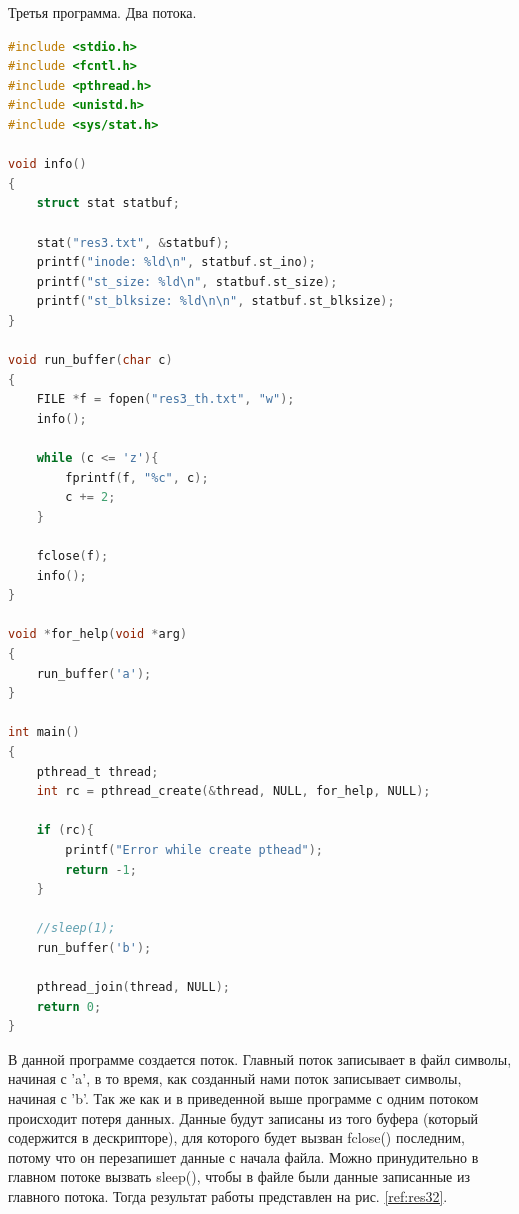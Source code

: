 \documentclass[a4paper,oneside,12pt]{extreport}
\begin{document}
\begin{task}
    \newpage

    Третья программа. Два потока.
    \begin{lstlisting}[language=C]
#include <stdio.h>
#include <fcntl.h>
#include <pthread.h>
#include <unistd.h>
#include <sys/stat.h>

void info()
{
	struct stat statbuf;
	
	stat("res3.txt", &statbuf);
	printf("inode: %ld\n", statbuf.st_ino);
	printf("st_size: %ld\n", statbuf.st_size);
	printf("st_blksize: %ld\n\n", statbuf.st_blksize);
}

void run_buffer(char c)
{
	FILE *f = fopen("res3_th.txt", "w");
	info();
	
	while (c <= 'z'){
		fprintf(f, "%c", c);
		c += 2;
	}
	
	fclose(f);
	info();
}

void *for_help(void *arg)
{
	run_buffer('a');
}

int main()
{
	pthread_t thread;
	int rc = pthread_create(&thread, NULL, for_help, NULL);
	
	if (rc){
		printf("Error while create pthead");
		return -1;
	}
	
	//sleep(1);
	run_buffer('b');
	
	pthread_join(thread, NULL);
	return 0;
}
    \end{lstlisting}

    В данной программе создается поток.
    Главный поток записывает в файл символы, начиная с 'a', в то время, как созданный
    нами поток записывает символы, начиная с 'b'. 
    Так же как и в приведенной выше программе с одним потоком происходит потеря данных.
    Данные будут записаны из того буфера (который содержится в дескрипторе), для которого
    будет вызван fclose() последним, потому что он перезапишет данные с начала файла.
    Можно принудительно в главном потоке вызвать sleep(), чтобы в файле были данные 
    записанные из главного потока. Тогда результат работы представлен на рис. \ref{ref:res32}.

\end{task}


\end{document}
